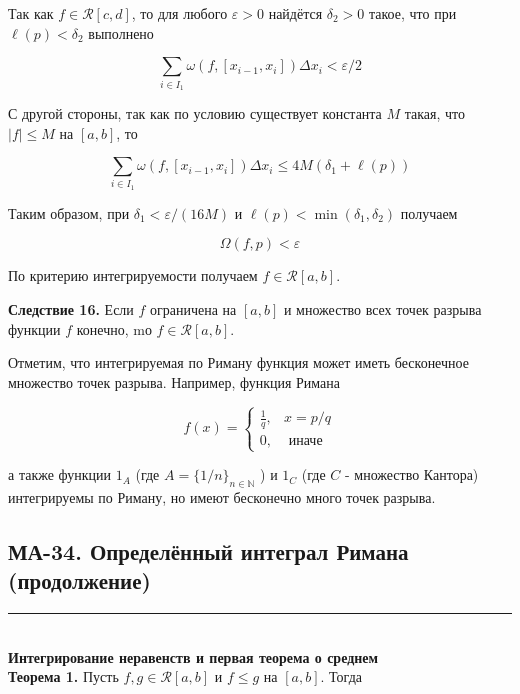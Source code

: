 \documentclass[a4paper,12pt]{article} %
\newcommand{\HRule}{\rule{\linewidth}{0.5mm}}
\begin{document}
	Так как $f \in \mathcal{R}[c, d]$, то для любого $\varepsilon>0$ найдётся $\delta_{2}>0$ такое, что при $\ell(p)<\delta_{2}$ выполнено
	
	$$
	\sum_{i \in I_{1}} \omega\left(f,\left[x_{i-1}, x_{i}\right]\right) \Delta x_{i}<\varepsilon / 2
	$$
	
	С другой стороны, так как по условию существует константа $M$ такая, что $|f| \leq M$ на $[a, b]$, то
	
	$$
	\sum_{i \in I_{1}} \omega\left(f,\left[x_{i-1}, x_{i}\right]\right) \Delta x_{i} \leq 4 M\left(\delta_{1}+\ell(p)\right)
	$$
	
	Таким образом, при $\delta_{1}<\varepsilon /(16 M)$ и $\ell(p)<\min \left(\delta_{1}, \delta_{2}\right)$ получаем
	
	$$
	\Omega(f, p)<\varepsilon
	$$
	
	По критерию интегрируемости получаем $f \in \mathcal{R}[a, b]$.
	
	\textbf{Следствие 16.} Если $f$ ограничена на $[a, b]$ и множество всех точек разрыва функции $f$ конечно, mо $f \in \mathcal{R}[a, b]$.
	
	Отметим, что интегрируемая по Риману функция может иметь бесконечное множество точек разрыва. Например, функция Римана
	
	$$
	f(x)= \begin{cases}\frac{1}{q}, & x=p / q \\ 0, & \text { иначе }\end{cases}
	$$
	
	а также функции $1_{A}$ (где $A=\{1 / n\}_{n \in \mathbb{N}}$ ) и $1_{C}$ (где $C$ - множество Кантора) интегрируемы по Риману, но имеют бесконечно много точек разрыва.
	




	\newpage

	\begin{LARGE}
		\begin{center}
			\section{МА-34. Определённый интеграл Римана (продолжение) }
		\end{center}
	\end{LARGE}
	\HRule \\

	\textbf{Интегрирование неравенств и первая теорема о среднем}\\
	\textbf{Теорема 1.} Пусть $f, g \in \mathcal{R}[a, b]$ и $f \leq g$ на $[a, b]$. Тогда
	
\end{document}
